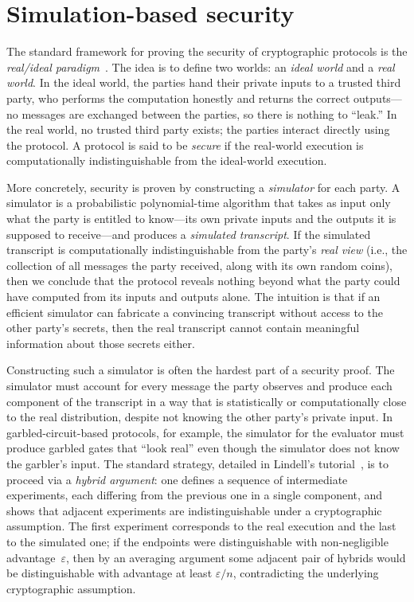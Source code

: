 \section{Simulation-based security}\label{sec:simulation}

The standard framework for proving the security of cryptographic protocols is the \emph{real/ideal paradigm}~\cite{Lin17}. The idea is to define two worlds: an \emph{ideal world} and a \emph{real world}. In the ideal world, the parties hand their private inputs to a trusted third party, who performs the computation honestly and returns the correct outputs---no messages are exchanged between the parties, so there is nothing to ``leak.'' In the real world, no trusted third party exists; the parties interact directly using the protocol. A protocol is said to be \emph{secure} if the real-world execution is computationally indistinguishable from the ideal-world execution.

More concretely, security is proven by constructing a \emph{simulator} for each party. A simulator is a probabilistic polynomial-time algorithm that takes as input only what the party is entitled to know---its own private inputs and the outputs it is supposed to receive---and produces a \emph{simulated transcript}. If the simulated transcript is computationally indistinguishable from the party's \emph{real view} (i.e., the collection of all messages the party received, along with its own random coins), then we conclude that the protocol reveals nothing beyond what the party could have computed from its inputs and outputs alone. The intuition is that if an efficient simulator can fabricate a convincing transcript without access to the other party's secrets, then the real transcript cannot contain meaningful information about those secrets either.

Constructing such a simulator is often the hardest part of a security proof. The simulator must account for every message the party observes and produce each component of the transcript in a way that is statistically or computationally close to the real distribution, despite not knowing the other party's private input. In garbled-circuit-based protocols, for example, the simulator for the evaluator must produce garbled gates that ``look real'' even though the simulator does not know the garbler's input. The standard strategy, detailed in Lindell's tutorial~\cite{Lin17}, is to proceed via a \emph{hybrid argument}: one defines a sequence of intermediate experiments, each differing from the previous one in a single component, and shows that adjacent experiments are indistinguishable under a cryptographic assumption. The first experiment corresponds to the real execution and the last to the simulated one; if the endpoints were distinguishable with non-negligible advantage~$\varepsilon$, then by an averaging argument some adjacent pair of hybrids would be distinguishable with advantage at least $\varepsilon/n$, contradicting the underlying cryptographic assumption.

